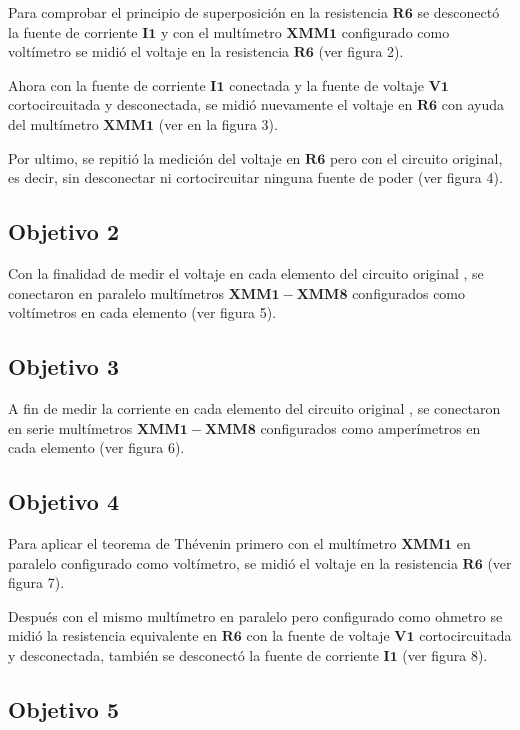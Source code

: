 \documentclass[DIV=calc, paper=a4, fontsize=11pt]{scrartcl}
\begin{document}
\begin{multicols}{2}
Para comprobar el principio de superposición en la resistencia $\mathbf{R6}$ se desconectó la fuente de corriente $\mathbf{I1}$ y con el multímetro $\mathbf{XMM1}$ configurado como voltímetro se midió el voltaje en la resistencia $\mathbf{R6}$ (ver figura 2).

Ahora con la fuente de corriente $\mathbf{I1}$ conectada y la fuente de voltaje $\mathbf{V1}$ cortocircuitada y desconectada, se midió nuevamente el voltaje en $\mathbf{R6}$ con ayuda del multímetro $\mathbf{XMM1}$ (ver en la figura 3).

Por ultimo, se repitió la medición del voltaje en $\mathbf{R6}$ pero con el circuito original, es decir, sin desconectar ni cortocircuitar ninguna fuente de poder (ver figura 4).

\subsection*{Objetivo 2}

Con la finalidad de medir el voltaje en cada elemento del circuito original , se conectaron en paralelo multímetros $\mathbf{XMM1}-\mathbf{XMM8}$ configurados como voltímetros en cada elemento (ver figura 5). 

\subsection*{Objetivo 3}

A fin de medir la corriente en cada elemento del circuito original , se conectaron en serie multímetros $\mathbf{XMM1}-\mathbf{XMM8}$ configurados como amperímetros en cada elemento (ver figura 6).

\subsection*{Objetivo 4}

Para aplicar el teorema de Thévenin primero con el multímetro $\mathbf{XMM1}$ en paralelo configurado como voltímetro, se midió el voltaje en la resistencia $\mathbf{R6}$ (ver figura 7).

Después con el mismo multímetro en paralelo pero configurado como ohmetro se midió la resistencia equivalente en $\mathbf{R6}$ con la fuente de voltaje $\mathbf{V1}$ cortocircuitada y desconectada, también se desconectó la fuente de corriente $\mathbf{I1}$ (ver figura 8).


\subsection*{Objetivo 5}


\end{multicols}
\end{document}
